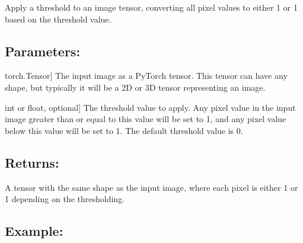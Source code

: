 \documentclass[a4paper,10pt,english]{sphinxmanual}
\begin{document}
\begin{fulllineitems}
\label{\detokenize{utils:fireDiff.Utils.utilities.threshold}}
\pysigstartsignatures
{}
\pysigstopsignatures
\sphinxAtStartPar
Apply a threshold to an image tensor, converting all pixel values to
either 1 or \sphinxhyphen{}1 based on the threshold value.


\subsection{Parameters:}
\label{\detokenize{utils:id1}}\begin{description}
\sphinxlineitem{image}{[}torch.Tensor{]}
\sphinxAtStartPar
The input image as a PyTorch tensor. This tensor can have any shape,
but typically it will be a 2D or 3D tensor representing an image.

\sphinxlineitem{value}{[}int or float, optional{]}
\sphinxAtStartPar
The threshold value to apply. Any pixel value in the input image
greater than or equal to this value will be set to 1, and any pixel
value below this value will be set to \sphinxhyphen{}1.
The default threshold value is 0.

\end{description}


\subsection{Returns:}
\label{\detokenize{utils:id2}}\begin{description}
\sphinxAtStartPar
A tensor with the same shape as the input image, where each pixel is
either 1 or \sphinxhyphen{}1 depending on the thresholding.

\end{description}


\subsection{Example:}
\label{\detokenize{utils:id3}}
\begin{sphinxVerbatim}[commandchars=\\\{\}]
 
  \PYG{p}{[}\PYG{p}{[} \PYG{p}{]} \PYG{p}{[} \PYG{p}{]}\PYG{p}{]}
   
\PYG{g+go}{(tensor([[ 1, \PYGZhy{}1],}
\PYG{g+go}{         [ 1, \PYGZhy{}1]]),)}
\end{sphinxVerbatim}


\end{fulllineitems}
\end{document}

